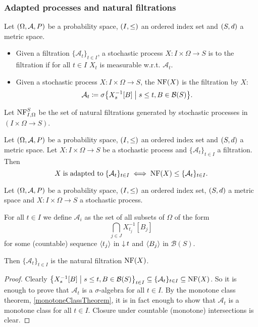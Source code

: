 \subsubsection{Adapted processes and natural filtrations}
\begin{definition}
Let $\sSet{\Omega, \mathcal{A}, P}$ be a probability space, $\sSet{I,\leq}$ an ordered index set and $\sSet{S,d}$ a metric space.

\begin{itemize}
\item Given a filtration $\{\mathcal{A}_t\}_{t\in I}$, a stochastic process $X: I\times \Omega \to S$ is  to the filtration if for all $t\in I$ $X_t$ is measurable w.r.t. $\mathcal{A}_t$.
\item Given a stochastic process $X: I\times \Omega \to S$, the  $\operatorname{NF}(X)$ is the filtration  by $X$:
\[ \mathcal{A}_t \defeq \sigma\setbuilder{X_s^{-1}[B]}{s\leq t, B\in \mathcal{B}(S)}. \]
\end{itemize}

Let $\operatorname{NF}_{I,\Omega}^S$ be the set of natural filtrations generated by stochastic processes in $(I\times\Omega \to S)$.
\end{definition}

\begin{lemma}
Let $\sSet{\Omega, \mathcal{A}, P}$ be a probability space, $\sSet{I,\leq}$ an ordered index set and $\sSet{S,d}$ a metric space. Let $X: I\times \Omega\to S$ be a stochastic process and $\{\mathcal{A}_t\}_{t\in I}$ a filtration. Then
\[ X \;\text{is adapted to}\; \{\mathcal{A}_t\}_{t\in I} \iff \operatorname{NF}(X) \leq \{\mathcal{A}_t\}_{t\in I}. \]
\end{lemma}

\begin{lemma}
Let $\sSet{\Omega, \mathcal{A}, P}$ be a probability space, $\sSet{I,\leq}$ an ordered index set, $\sSet{S,d}$ a metric space and $X: I\times\Omega\to S$ a stochastic process.

For all $t\in I$ we define $\mathcal{A}_i$ as the set of all subsets of $\Omega$ of the form
\[ \bigcap_{j\in J} X_{t_j}^{-1}[B_j] \]
for some (countable) sequence $\left\langle t_j \right\rangle$ in $\operatorname{\downarrow} t$ and $\left\langle B_j \right\rangle$ in $\mathcal{B}(S)$.

Then $\{\mathcal{A}_t\}_{t\in I}$ is the natural filtration $\operatorname{NF}(X)$.
\end{lemma}
\begin{proof}
Clearly $\setbuilder{X_s^{-1}[B]}{s\leq t, B\in \mathcal{B}(S)}_{t\in I} \subseteq \{\mathcal{A}_t\}_{t\in I} \subseteq \NF(X)$. So it is enough to prove that $\mathcal{A}_t$ is a $\sigma$-algebra for all $t\in I$. By the monotone class theorem, \ref{monotoneClassTheorem}, it is in fact enough to show that $\mathcal{A}_t$ is a monotone class for all $t\in I$. Closure under countable (monotone) intersections is clear.


\end{proof}

